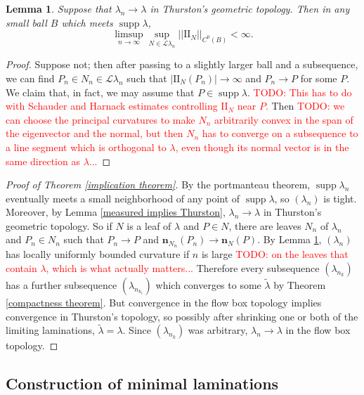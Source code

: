\documentclass[reqno,11pt]{amsart}
\DeclareMathOperator{\supp}{supp}
\newcommand{\Leaves}{\mathscr L}
\newcommand{\Two}{\mathrm{I\!I}}
\newcommand{\normal}{\mathbf n}
\newtheorem{lemma}[theorem]{Lemma}
\theoremstyle{definition}
\numberwithin{equation}{section}
\newcommand\todo[1]{\textcolor{red}{TODO: #1}}
\begin{document}
\begin{lemma}\label{Thurston implies bounds on Two}
Suppose that $\lambda_n \to \lambda$ in Thurston's geometric topology. Then in any small ball $B$ which meets $\supp \lambda$,
$$\limsup_{n \to \infty} \sup_{N \in \Leaves \lambda_n} ||\Two_N||_{C^0(B)} < \infty.$$
\end{lemma}
\begin{proof}
Suppose not; then after passing to a slightly larger ball and a subsequence, we can find $P_n \in N_n \in \Leaves \lambda_n$ such that $|\Two_N(P_n)| \to \infty$ and $P_n \to P$ for some $P$.
We claim that, in fact, we may assume that $P \in \supp \lambda$. \todo{This has to do with Schauder and Harnack estimates controlling $\Two_N$ near $P$.}
Then \todo{we can choose the principal curvatures to make $N_n$ arbitrarily convex in the span of the eigenvector and the normal, but then $N_n$ has to converge on a subsequence to a line segment which is orthogonal to $\lambda$, even though its normal vector is in the same direction as $\lambda$...}
\end{proof}

\begin{proof}[Proof of Theorem \ref{implication theorem}]
By the portmanteau theorem, $\supp \lambda_n$ eventually meets a small neighborhood of any point of $\supp \lambda$, so $(\lambda_n)$ is tight.
Moreover, by Lemma \ref{measured implies Thurston}, $\lambda_n \to \lambda$ in Thurston's geometric topology.
So if $N$ is a leaf of $\lambda$ and $P \in N$, there are leaves $N_n$ of $\lambda_n$ and $P_n \in N_n$ such that $P_n \to P$ and $\normal_{N_n}(P_n) \to \normal_N(P)$.
By Lemma \ref{Thurston implies bounds on Two}, $(\lambda_n)$ has locally uniformly bounded curvature if $n$ is large \todo{on the leaves that contain $\lambda$, which is what actually matters...}
Therefore every subsequence $(\lambda_{n_k})$ has a further subsequence $(\lambda_{n_{k_\ell}})$ which converges to some $\tilde \lambda$ by Theorem \ref{compactness theorem}.
But convergence in the flow box topology implies convergence in Thurston's topology, so possibly after shrinking one or both of the limiting laminations, $\tilde \lambda = \lambda$.
Since $(\lambda_{n_k})$ was arbitrary, $\lambda_n \to \lambda$ in the flow box topology.
\end{proof}


\subsection{Construction of minimal laminations}
\end{document}
